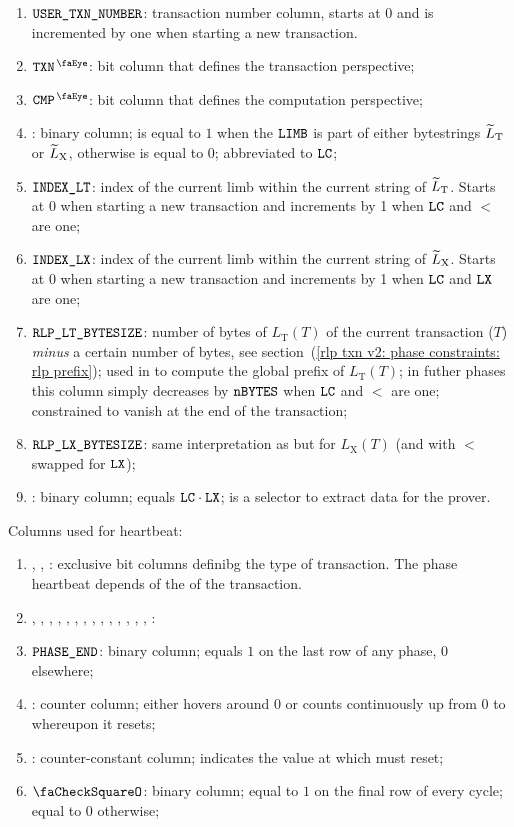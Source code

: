 \begin{enumerate}
    \item $\texttt{USER}\texttt{\_}\texttt{TXN\_NUMBER}$:
	transaction number column, starts at 0 and is incremented by one when starting a new transaction.
    \item $\isTxn$:
	bit column that defines the transaction perspective;
    \item $\isCmp$:
	bit column that defines the computation perspective;
    \item {}:
	binary column;
	is equal to $1$ when the $\texttt{LIMB}$ is part of either \rlp{} bytestrings $\widetilde{L}_{\mathrm{T}}$ or $\widetilde{L}_{\mathrm{X}}$, otherwise is equal to $0$;
	abbreviated to $\texttt{LC}$;
    \item $\texttt{INDEX\_LT}$:
	index of the current limb within the current string of $\widetilde{L}_{\mathrm{T}}$. Starts at 0 when starting a new transaction and increments by 1 when $\texttt{LC}$ and $\lt$ are one; 
    \item $\texttt{INDEX\_LX}$:                                                       
	index of the current limb within the current string of $\widetilde{L}_{\mathrm{X}}$. Starts at 0 when starting a new transaction and increments by 1 when $\texttt{LC}$ and $\texttt{LX}$ are one;
    \item $\texttt{RLP\_LT\_BYTESIZE}$:
	number of bytes of $L_{\mathrm{T}}(T)$ of the current transaction ($T$) \emph{minus} a certain number of bytes,
	see section~(\ref{rlp txn v2: phase constraints: rlp prefix});
	used in \phaseRlpPrefix{} to compute the global \rlp{} prefix of $L_{\mathrm{T}}(T)$;
	in futher phases this column simply decreases by $\texttt{nBYTES}$ when $\texttt{LC}$ and $\lt$ are one;
	constrained to vanish at the end of the transaction;
    \item $\texttt{RLP\_LX\_BYTESIZE}$:
	same interpretation as \rlptsize{} but for $L_{\mathrm{X}}(T)$
	(and with $\lt$ swapped for $\texttt{LX}$);
    \item \toHashByProver{}:
	binary column; equals $\texttt{LC} \cdot \texttt{LX}$; is a selector to extract data for the prover.
\end{enumerate}
Columns used for heartbeat:
\begin{enumerate}[resume]
    \item \typeZeroTx{}, \typeOneTx{}, \typeTwoTx{}:
	exclusive bit columns definibg the type of transaction. The phase heartbeat depends of the \transactionType{} of the transaction.
    \item \phaseRlpPrefix{}, \phaseChainId{}, \phaseNonce{}, \phaseGasPrice{}, \phaseMaxPriorityFeePerGas{}, \phaseMaxFeePerGas{}, \phaseGasLimit{}, \phaseTo{}, \phaseValue{}, \phaseData{}, \phaseAccessList{}, \phaseBeta{}, \phaseY{}, \phaseR{}, \phaseS{}:
    \item $\texttt{PHASE\_END}$:
	binary column; equals $1$ on the last row of any phase, $0$ elsewhere;
    \item \ct{}:
	counter column; 
	either hovers around $0$ or counts continuously up from $0$ to \maxCt{} whereupon it resets;
    \item \maxCt:
	counter-constant column;
	indicates the value at which \ct{} must reset;
    \item $\done$:
	binary column; equal to $1$ on the final row of every \ct{} cycle; equal to $0$ otherwise;
\end{enumerate}

